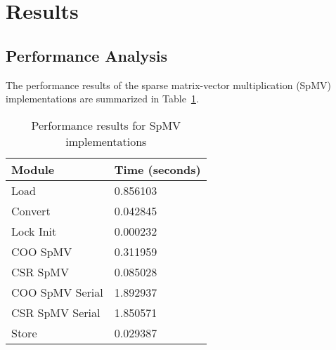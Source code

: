 \documentclass[12pt]{article}
\begin{document}
\section{Results}
\label{sec:results}

\subsection{Performance Analysis}
The performance results of the sparse matrix-vector multiplication (SpMV) implementations are summarized in Table~\ref{tab:performance_results}.

\begin{table}[h]
    \centering
    \caption{Performance results for SpMV implementations}
    \label{tab:performance_results}
    \begin{tabular}{|l|l|}
    \hline
    \textbf{Module} & \textbf{Time (seconds)} \\
    \hline
    Load             & 0.856103 \\
    Convert          & 0.042845 \\
    Lock Init        & 0.000232 \\
    COO SpMV         & 0.311959 \\
    CSR SpMV         & 0.085028 \\
    COO SpMV Serial  & 1.892937 \\
    CSR SpMV Serial  & 1.850571 \\
    Store            & 0.029387 \\
    \hline
    \end{tabular}
\end{table}
\end{document}
